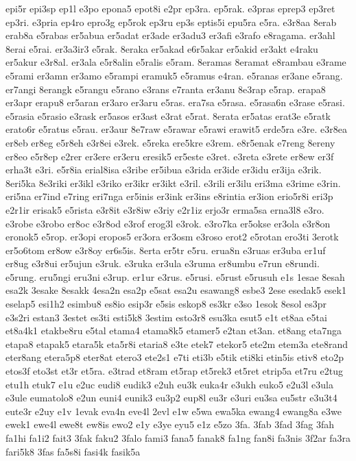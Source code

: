 {epi5r epi3sp ep1l e3po epona5 epot8i e2pr ep3ra. ep5rak. e3pras eprep3
ep3ret ep3ri. e3pria ep4ro epro3g ep5rok ep3ru ep3s eptis5i epu5ra e5ra.
e3r8aa 8erab erab8a e5rabas er5abua er5adat er3ade er3adu3 er3afi e3rafo
e8ragama. er3ahl 8erai e5rai. er3a3ir3 e5rak. 8eraka er5akad e6r5akar
er5akid er3akt e4raku er5akur e3r8al. er3ala e5r8alin e5ralis e5ram.
8eramas 8eramat e8rambau e3rame e5rami er3amn er3amo e5rampi eramuk5
e5ramus e4ran. e5ranas er3ane e5rang. er7angi 8erangk e5rangu e5rano
e3rans e7ranta er3anu 8e3rap e5rap. erapa8 er3apr erapu8 er5aran er3aro
er3aru e5ras. era7sa e5rasa. e5rasa6n e3rase e5rasi. e5rasia e5rasio
e3rask er5asos er3ast e3rat e5rat. 8erata er5atas erat3e e5ratk erato6r
e5ratus e5rau. er3aur 8e7raw e5rawar e5rawi erawit5 erde5ra e3re. e3r8ea
er8eb er8eg e5r8eh e3r8ei e3rek. e5reka ere5kre e3rem. e8r5enak e7reng
8ereny er8eo e5r8ep e2rer er3ere er3eru eresik5 er5este e3ret. e3reta
e3rete er8ew er3f erha3t e3ri. e5r8ia erial8isa e3ribe er5ibua e3rida
er3ide er3idu er3ija e3rik. 8eri5ka 8e3riki er3ikl e3riko er3ikr er3ikt
e3ril. e3rili er3ilu eri3ma e3rime e3rin. eri5na er7ind e7ring eri7nga
er5inis er3ink er3ins e8rintia er3ion erio5r8i eri3p e2r1ir erisak5
e5rista e3r8it e3r8iw e3riy e2r1iz erjo3r erma5sa erna3l8 e3ro. e3robe
e3robo er8oc e3r8od e3rof erog3l e3rok. e3ro7ka er5okse er3ola e3r8on
eronok5 e5rop. er3opi eropos5 er3ora er3osm e3roso erot2 e5rotan ero3ti
3erotk er5o6tom er8ow e3r8oy er6s5is. 8erta er5tr e5ru. erua8n e3ruas
er3uba er1uf er8ug e3r8ui er5ujun e3ruk. e3ruka er3ula e3ruma er8umbu
e7run e8rundi. e5rung. eru5ngi eru3ni e3rup. er1ur e3rus. e5rusi. e5rust
e5rusuh e1s 1esae 8esah esa2k 3esake 8esakk 4esa2n esa2p e5sat esa2u
esawang8 esbe3 2ese esedak5 esek1 eselap5 esi1h2 esimbu8 es8io esip3r
e5sis eskop8 es3kr e3so 1esok 8esol es3pr e3s2ri estan3 3estet es3ti
esti5k8 3estim esto3r8 esu3ka esut5 e1t et8aa e5tai et8a4k1 etakbe8ru
e5tal etama4 etama8k5 etamer5 e2tan et3an. et8ang eta7nga etapa8 etapak5
etara5k eta5r8i etaria8 e3te etek7 etekor5 ete2m etem3a ete8rand eter8ang
etera5p8 eter8at etero3 ete2s1 e7ti eti3b e5tik eti8ki etin5is etiv8 eto2p
etos3f eto3st et3r et5ra. e3trad et8ram et5rap et5rek3 et5ret etrip5a
et7ru e2tug etu1h etuk7 e1u e2uc eudi8 eudik3 e2uh eu3k euka4r e3ukh euko5
e2u3l e3ula e3ule eumatolo8 e2un euni4 eunik3 eu3p2 eup8l eu3r e3uri eu3sa
eu5str e3u3t4 eute3r e2uy e1v 1evak eva4n eve4l 2evl e1w e5wa ewa5ka
ewang4 ewang8a e3we ewek1 ewe4l ewe8t ew8is ewo2 e1y e3ye eyu5 e1z e5zo
3fa. 3fab 3fad 3fag 3fah fa1hi fa1i2 fait3 3fak faku2 3falo fami3 fana5
fanak8 fa1ng fan8i fa3nis 3f2ar fa3ra fari5k8 3fas fa5s8i fasi4k fasik5a
}
